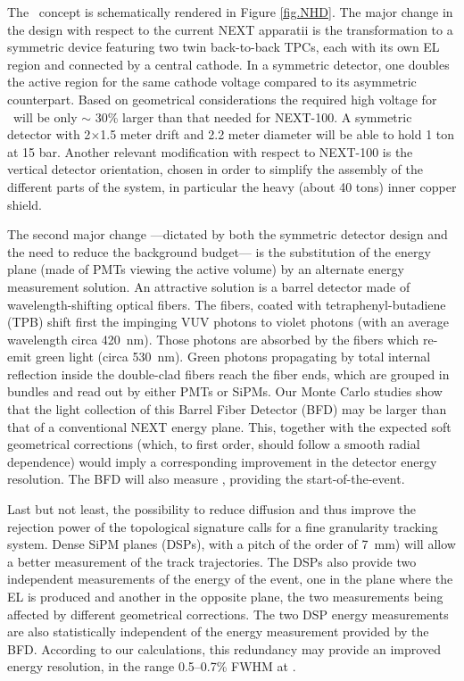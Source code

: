 The \NHD\ concept is schematically rendered in Figure \ref{fig.NHD}. %
The major change in the design with respect to the current NEXT apparatii is the transformation to a symmetric device featuring two twin back-to-back TPCs, each  with its own EL region and connected by a central cathode. In a symmetric detector, one doubles the active region for the same cathode voltage compared to its asymmetric counterpart.   Based on geometrical considerations the required high voltage for \NHD\ will be only $\sim$ 30\% larger than that needed for NEXT-100. A symmetric detector with 2$\times$1.5 meter drift and 2.2 meter diameter will be able to hold 1 ton at 15 bar. Another relevant modification with respect to NEXT-100 is the vertical detector orientation, chosen in order to simplify the assembly of the different parts of the system, in particular the heavy (about 40 tons) inner copper shield. 

The second major change ---dictated by both the symmetric detector design and the need to reduce the background budget--- is the substitution of the energy plane (made of PMTs viewing the active volume) by an alternate energy measurement solution.  An attractive solution is a barrel detector made of wavelength-shifting optical fibers. The fibers, coated with tetraphenyl-butadiene (TPB) shift first the impinging VUV photons to violet photons (with an average wavelength circa \SI{420}{\nm}). Those photons are absorbed by the fibers which re-emit green light (circa  \SI{530}{\nm}). Green photons propagating by total internal reflection inside the double-clad fibers reach the fiber ends, which are grouped in bundles and read out by either PMTs or SiPMs. Our Monte Carlo studies show that the light collection of this Barrel Fiber Detector (BFD) may be larger than that of a conventional NEXT energy plane. This, together with the expected soft geometrical corrections (which, to first order, should follow a smooth radial dependence) would imply a corresponding improvement in the detector energy resolution. The BFD will also measure \sone, providing the start-of-the-event. 

Last but not least, the possibility to reduce diffusion and thus improve the rejection power of the topological signature calls for a fine granularity tracking system. Dense SiPM planes (DSPs), with a pitch of the order of \SI{7}{\mm}) will allow a better measurement of the track trajectories. The DSPs also provide two independent measurements of the energy of the event, one in the plane where the EL is produced and another in the opposite plane, the two measurements being affected by different geometrical corrections. The two DSP energy measurements are also statistically independent of the energy measurement provided by the BFD. According to our calculations, this redundancy may provide an improved energy resolution, in the range 0.5--0.7\% FWHM at \Qbb. 

